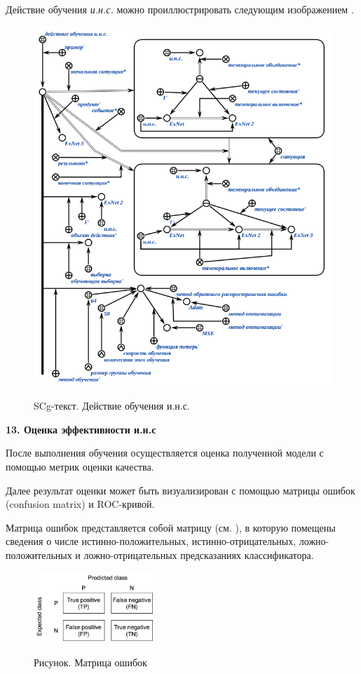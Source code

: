 Действие обучения \textit{и.н.с.} можно проиллюстрировать следующим изображением \textit{}.

\begin{figure}[H]
	\caption{SCg-текст. Действие обучения и.н.с.}
	\includegraphics[scale=0.7]{author/part3/figures/ann_training_nn_scg.png}
	\label{fig:ann_training_nn_scg}
\end{figure}

\textbf{13. Оценка эффективности и.н.с}

После выполнения обучения осуществляется оценка полученной модели с помощью метрик оценки качества.

Далее результат оценки может быть визуализирован с помощью матрицы ошибок (confusion matrix) и ROC-кривой.

Матрица ошибок представляется собой матрицу (см. ), в которую помещены сведения о числе истинно-положительных, истинно-отрицательных, ложно-положительных и ложно-отрицательных предсказаниях классификатора.

\begin{figure}[H]
	\caption{Рисунок. Матрица ошибок}
	\includegraphics[width=0.4\textwidth]{author/part3/figures/conf_matrix.png}
	\label{fig:conf_matrix}
\end{figure}

